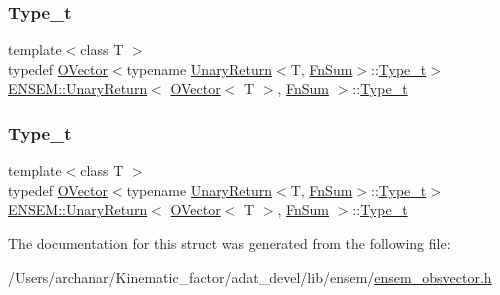 \subsubsection{\texorpdfstring{Type\_t}{Type\_t}\hspace{0.1cm}{\footnotesize\ttfamily [1/2]}}
{\footnotesize\ttfamily template$<$class T $>$ \\
typedef \mbox{\hyperlink{classENSEM_1_1OVector}{O\+Vector}}$<$typename \mbox{\hyperlink{structENSEM_1_1UnaryReturn}{Unary\+Return}}$<$T, \mbox{\hyperlink{structENSEM_1_1FnSum}{Fn\+Sum}}$>$\+::\mbox{\hyperlink{structENSEM_1_1UnaryReturn_3_01OVector_3_01T_01_4_00_01FnSum_01_4_aeade0fc333784b1705f2ab3348b5fed1}{Type\+\_\+t}}$>$ \mbox{\hyperlink{structENSEM_1_1UnaryReturn}{E\+N\+S\+E\+M\+::\+Unary\+Return}}$<$ \mbox{\hyperlink{classENSEM_1_1OVector}{O\+Vector}}$<$ T $>$, \mbox{\hyperlink{structENSEM_1_1FnSum}{Fn\+Sum}} $>$\+::\mbox{\hyperlink{structENSEM_1_1UnaryReturn_3_01OVector_3_01T_01_4_00_01FnSum_01_4_aeade0fc333784b1705f2ab3348b5fed1}{Type\+\_\+t}}}

\mbox{\label{structENSEM_1_1UnaryReturn_3_01OVector_3_01T_01_4_00_01FnSum_01_4_aeade0fc333784b1705f2ab3348b5fed1}} 
\subsubsection{\texorpdfstring{Type\_t}{Type\_t}\hspace{0.1cm}{\footnotesize\ttfamily [2/2]}}
{\footnotesize\ttfamily template$<$class T $>$ \\
typedef \mbox{\hyperlink{classENSEM_1_1OVector}{O\+Vector}}$<$typename \mbox{\hyperlink{structENSEM_1_1UnaryReturn}{Unary\+Return}}$<$T, \mbox{\hyperlink{structENSEM_1_1FnSum}{Fn\+Sum}}$>$\+::\mbox{\hyperlink{structENSEM_1_1UnaryReturn_3_01OVector_3_01T_01_4_00_01FnSum_01_4_aeade0fc333784b1705f2ab3348b5fed1}{Type\+\_\+t}}$>$ \mbox{\hyperlink{structENSEM_1_1UnaryReturn}{E\+N\+S\+E\+M\+::\+Unary\+Return}}$<$ \mbox{\hyperlink{classENSEM_1_1OVector}{O\+Vector}}$<$ T $>$, \mbox{\hyperlink{structENSEM_1_1FnSum}{Fn\+Sum}} $>$\+::\mbox{\hyperlink{structENSEM_1_1UnaryReturn_3_01OVector_3_01T_01_4_00_01FnSum_01_4_aeade0fc333784b1705f2ab3348b5fed1}{Type\+\_\+t}}}



The documentation for this struct was generated from the following file\+:\begin{DoxyCompactItemize}
\item 
/\+Users/archanar/\+Kinematic\+\_\+factor/adat\+\_\+devel/lib/ensem/\mbox{\hyperlink{lib_2ensem_2ensem__obsvector_8h}{ensem\+\_\+obsvector.\+h}}\end{DoxyCompactItemize}
